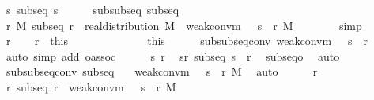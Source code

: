\documentclass{article}
\theoremstyle{definition}
\begin{document}
\begin{isabellebody}
\ s{\isacharcolon}\ {\isachardoublequoteopen}subseq\ s{\isachardoublequoteclose}\isanewline
\ \ \ \ \isamarkupfalse%
\ subsubseq\ subseq\ \isamarkupfalse%
\ {\isachardoublequoteopen}{\isasymexists}r\ M{\isachardot}\ subseq\ r\ {\isasymand}\ real{\isacharunderscore}distribution\ M\ {\isasymand}\ weak{\isacharunderscore}conv{\isacharunderscore}m\ {\isacharparenleft}{\isasymmu}\ {\isasymcirc}\ s\ {\isasymcirc}\ r{\isacharparenright}\ M{\isachardoublequoteclose}\isanewline
\ \ \ \ \ \ \isamarkupfalse%
\ simp\isanewline
\ \ \ \ \isamarkupfalse%
\ \isamarkupfalse%
\ r\ \isacommand{{\isachardot}{\isachardot}}\isamarkupfalse%
\ \isamarkupfalse%
\ r\ {\isacharequal}\ this\isanewline
\ \ \ \ \isamarkupfalse%
\ \isamarkupfalse%
\ {\isasymnu}\ \isacommand{{\isachardot}{\isachardot}}\isamarkupfalse%
\ \isamarkupfalse%
\ {\isasymnu}\ {\isacharequal}\ this\isanewline
\ \ \ \ \isamarkupfalse%
\ subsubseq{\isacharunderscore}conv{\isacharcolon}\ {\isachardoublequoteopen}weak{\isacharunderscore}conv{\isacharunderscore}m\ {\isacharparenleft}{\isasymmu}\ {\isasymcirc}\ {\isacharparenleft}s\ {\isasymcirc}\ r{\isacharparenright}{\isacharparenright}\ {\isasymnu}{\isachardoublequoteclose}\ \isamarkupfalse%
\ {\isacharparenleft}auto\ simp\ add{\isacharcolon}\ o{\isacharunderscore}assoc{\isacharparenright}\isanewline
\ \ \ \ \isamarkupfalse%
\ s\ r\ \isamarkupfalse%
\ sr{\isacharcolon}\ {\isachardoublequoteopen}subseq\ {\isacharparenleft}s\ {\isasymcirc}\ r{\isacharparenright}{\isachardoublequoteclose}\ \isamarkupfalse%
\ subseq{\isacharunderscore}o\ \isamarkupfalse%
\ auto\isanewline
\ \ \ \ \isamarkupfalse%
\ subsubseq{\isacharunderscore}conv\ subseq\ {\isasymnu}\ \isamarkupfalse%
\ {\isachardoublequoteopen}weak{\isacharunderscore}conv{\isacharunderscore}m\ {\isacharparenleft}{\isasymmu}\ {\isasymcirc}\ {\isacharparenleft}s\ {\isasymcirc}\ r{\isacharparenright}{\isacharparenright}\ M{\isachardoublequoteclose}\ \isamarkupfalse%
\ auto\isanewline
\ \ \ \ \isamarkupfalse%
\ r\ \isamarkupfalse%
\ {\isachardoublequoteopen}{\isasymexists}r{\isachardot}\ subseq\ r\ {\isasymand}\ weak{\isacharunderscore}conv{\isacharunderscore}m\ {\isacharparenleft}{\isasymmu}\ {\isasymcirc}\ {\isacharparenleft}s\ {\isasymcirc}\ r{\isacharparenright}{\isacharparenright}\ M{\isachardoublequoteclose}\ \isamarkupfalse%

\end{isabellebody}
\end{document}
